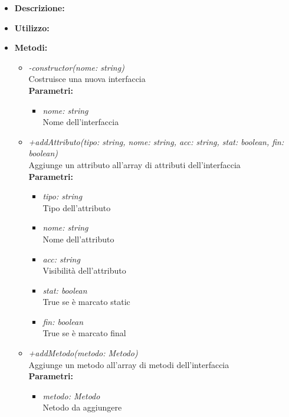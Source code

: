 \begin{itemize}
	\item \textbf{Descrizione:}\\
	
	\item \textbf{Utilizzo:}\\
	
	\item \textbf{Metodi:}
		\begin{itemize}
			\item \emph{-constructor(nome: string)}\\
    		Costruisce una nuova interfaccia\\
    		\textbf{Parametri:}
    		\begin{itemize}
    			\item \emph{nome: string}\\
    			Nome dell'interfaccia
    		\end{itemize}
    		\item \emph{+addAttributo(tipo: string, nome: string, acc: string, stat: boolean, fin: boolean)}\\
    		Aggiunge un attributo all'array di attributi dell'interfaccia\\
    		\textbf{Parametri:}
    		\begin{itemize}
    			\item \emph{tipo: string}\\
    			Tipo dell'attributo
    			\item \emph{nome: string}\\
    			Nome dell'attributo
    			\item \emph{acc: string}\\
    			Visibilità dell'attributo
    			\item \emph{stat: boolean}\\
    			True se è marcato static
    			\item \emph{fin: boolean}\\
    			True se è marcato final
    		\end{itemize}
    		\item \emph{+addMetodo(metodo: Metodo)}\\
    		Aggiunge un metodo all'array di metodi dell'interfaccia\\
    		\textbf{Parametri:}
    		\begin{itemize}
    			\item \emph{metodo: Metodo}\\
    			Netodo da aggiungere

\end{itemize}
\end{itemize}
\end{itemize}
